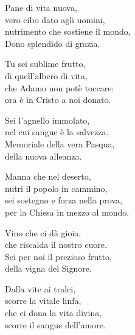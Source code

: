
\strofa Pane di vita nuova,\\
vero cibo dato agli uomini,\\
nutrimento che sostiene il mondo,\\
Dono splendido di grazia.

\spazio

\strofa Tu sei sublime frutto,\\
di quell'albero di vita,\\
che Adamo non potè toccare:\\
ora è in Cristo a noi donato.

\spazio


\spazio

\strofa Sei l'agnello immolato,\\
nel cui sangue è la salvezza.\\
Memoriale della vera Pasqua,\\
della nuova alleanza.

\spazio

\strofa Manna che nel deserto,\\
nutri il popolo in cammino,\\
sei sostegno e forza nella prova,\\
per la Chiesa in mezzo al mondo.

\spazio


\spazio

\strofa Vino che ci dà gioia,\\
che riscalda il nostro cuore.\\
Sei per noi il prezioso frutto,\\
della vigna del Signore.

\spazio

\strofa Dalla vite ai tralci,\\
scorre la vitale linfa,\\
che ci dona la vita divina,\\
scorre il sangue dell'amore.

\spazio


\spazio

